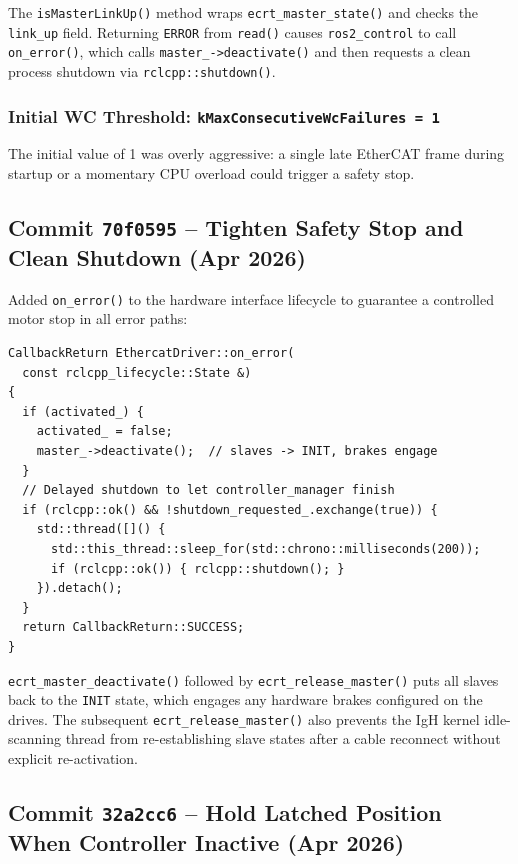 \documentclass[11pt,a4paper]{article}
\begin{document}
The \texttt{isMasterLinkUp()} method wraps \texttt{ecrt\_master\_state()} and
checks the \texttt{link\_up} field.  Returning \texttt{ERROR} from
\texttt{read()} causes \texttt{ros2\_control} to call
\texttt{on\_error()}, which calls \texttt{master\_->deactivate()} and then
requests a clean process shutdown via \texttt{rclcpp::shutdown()}.

\subsubsection{Initial WC Threshold: \texttt{kMaxConsecutiveWcFailures = 1}}

The initial value of 1 was overly aggressive: a single late EtherCAT frame
during startup or a momentary CPU overload could trigger a safety stop.

\subsection{Commit \texttt{70f0595} -- Tighten Safety Stop and Clean Shutdown (Apr 2026)}

Added \texttt{on\_error()} to the hardware interface lifecycle to guarantee a
controlled motor stop in all error paths:

\begin{lstlisting}[caption={\texttt{on\_error()} safe shutdown}]
CallbackReturn EthercatDriver::on_error(
  const rclcpp_lifecycle::State &)
{
  if (activated_) {
    activated_ = false;
    master_->deactivate();  // slaves -> INIT, brakes engage
  }
  // Delayed shutdown to let controller_manager finish
  if (rclcpp::ok() && !shutdown_requested_.exchange(true)) {
    std::thread([]() {
      std::this_thread::sleep_for(std::chrono::milliseconds(200));
      if (rclcpp::ok()) { rclcpp::shutdown(); }
    }).detach();
  }
  return CallbackReturn::SUCCESS;
}
\end{lstlisting}

\texttt{ecrt\_master\_deactivate()} followed by
\texttt{ecrt\_release\_master()} puts all slaves back to the \texttt{INIT}
state, which engages any hardware brakes configured on the drives.  The
subsequent \texttt{ecrt\_release\_master()} also prevents the IgH kernel
idle-scanning thread from re-establishing slave states after a cable
reconnect without explicit re-activation.

\subsection{Commit \texttt{32a2cc6} -- Hold Latched Position When Controller Inactive (Apr 2026)}
\end{document}
